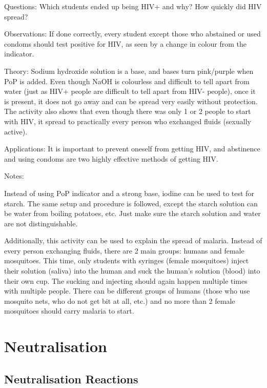 \begin{multicols}{2}
\begin{description*}
\item[Questions:]{Which students ended up being HIV+ and why? How quickly did HIV spread?}
\item[Observations:]{If done correctly, every student except those who abstained or used condoms should test positive for HIV, as seen by a change in colour from the indicator.}
\item[Theory:]{Sodium hydroxide solution is a base, and bases turn pink/purple when PoP is added. Even though NaOH is colourless and difficult to tell apart from water (just as HIV+ people are difficult to tell apart from HIV- people), once it is present, it does not go away and can be spread very easily without protection. The activity also shows that even though there was only 1 or 2 people to start with HIV, it spread to practically every person who exchanged fluids (sexually active).}
\item[Applications:]{It is important to prevent oneself from getting HIV, and abstinence and using condoms are two highly effective methods of getting HIV.}
\item[Notes:]{Instead of using PoP indicator and a strong base, iodine can be used to test for starch. The same setup and procedure is followed, except the starch solution can be water from boiling potatoes, etc. Just make sure the starch solution and water are not distinguishable. 

Additionally, this activity can be used to explain the spread of malaria. Instead of every person exchanging fluids, there are 2 main groups: humans and female mosquitoes. This time, only students with syringes (female mosquitoes) inject their solution (saliva) into the human and suck the human's solution (blood) into their own cup. The sucking and injecting should again happen multiple times with multiple people. There can be different groups of humans (those who use mosquito nets, who do not get bit at all, etc.) and no more than 2 female mosquitoes should carry malaria to start.}
\end{description*}

\vfill
\columnbreak


\section*{Neutralisation} 


\subsection{Neutralisation Reactions}


\end{multicols}

